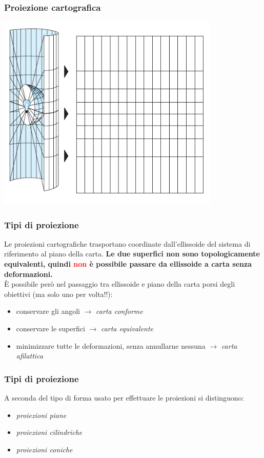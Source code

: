 \documentclass{beamer}
\begin{document}
{\begin{frame}
   \frametitle{Proiezione cartografica}
	\begin{center}
	\includegraphics[width=0.8\textwidth] {./pics/proiezione.png}
	\end{center}
\end{frame}

\begin{frame}
   \frametitle{Tipi di proiezione}
	Le proiezioni cartografiche trasportano coordinate dall'ellissoide del sistema di riferimento al piano della carta. \textbf{Le due superfici non sono topologicamente equivalenti, quindi \textcolor{red}{non} è possibile passare da ellissoide a carta senza deformazioni.} \\
	\bigskip
    È possibile però nel passaggio tra ellissoide e piano della carta porsi
    degli obiettivi (ma solo uno per volta!!):
	\begin{itemize}
		\item conservare gli angoli $\rightarrow $ \textit{carta conforme}
		\item conservare le superfici $\rightarrow $ \textit{carta equivalente}
		\item minimizzare tutte le deformazioni, senza annullarne nessuna $\rightarrow $  \textit{carta afilattica}
	\end{itemize}
\end{frame}

\begin{frame}
   \frametitle{Tipi di proiezione}
	A seconda del tipo di forma usato per effettuare le proiezioni si distinguono: 
	\begin{itemize}
		\item \textit{proiezioni piane}
		\item \textit{proiezioni cilindriche}
		\item \textit{proiezioni coniche}
	\end{itemize}
\end{frame}

}
\end{document}
